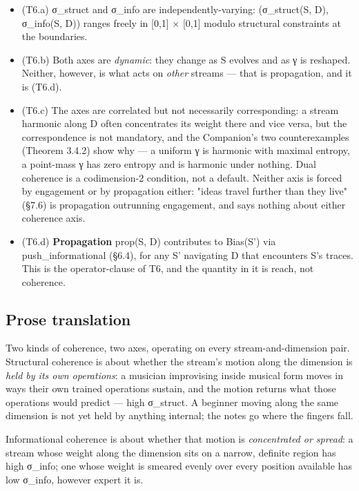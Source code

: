 \documentclass[11pt, openany]{book}
\begin{document}
\begin{itemize}
\item (T6.a) σ\_\allowbreak{}struct and σ\_\allowbreak{}info are independently-varying: (σ\_\allowbreak{}struct(S, D), σ\_\allowbreak{}info(S, D)) ranges freely in [0,1] × [0,1] modulo structural constraints at the boundaries.
\item (T6.b) Both axes are \textit{dynamic}: they change as S evolves and as γ is reshaped. Neither, however, is what acts on \textit{other} streams --- that is propagation, and it is (T6.d).
\item (T6.c) The axes are correlated but not necessarily corresponding: a stream harmonic along D often concentrates its weight there and vice versa, but the correspondence is not mandatory, and the Companion's two counterexamples (Theorem 3.4.2) show why --- a uniform γ is harmonic with maximal entropy, a point-mass γ has zero entropy and is harmonic under nothing. Dual coherence is a codimension-2 condition, not a default. Neither axis is forced by engagement or by propagation either: "ideas travel further than they live" (§7.6) is propagation outrunning engagement, and says nothing about either coherence axis.
\item (T6.d) \textbf{Propagation} prop(S, D) contributes to Bias(S') via push\_\allowbreak{}informational (§6.4), for any S' navigating D that encounters S's traces. This is the operator-clause of T6, and the quantity in it is reach, not coherence.
\end{itemize}

\subsection{Prose translation}

Two kinds of coherence, two axes, operating on every stream-and-dimension pair. Structural coherence is about whether the stream's motion along the dimension is \textit{held by its own operations}: a musician improvising inside musical form moves in ways their own trained operations sustain, and the motion returns what those operations would predict --- high σ\_\allowbreak{}struct. A beginner moving along the same dimension is not yet held by anything internal; the notes go where the fingers fall.

Informational coherence is about whether that motion is \textit{concentrated or spread}: a stream whose weight along the dimension sits on a narrow, definite region has high σ\_\allowbreak{}info; one whose weight is smeared evenly over every position available has low σ\_\allowbreak{}info, however expert it is.
\end{document}
